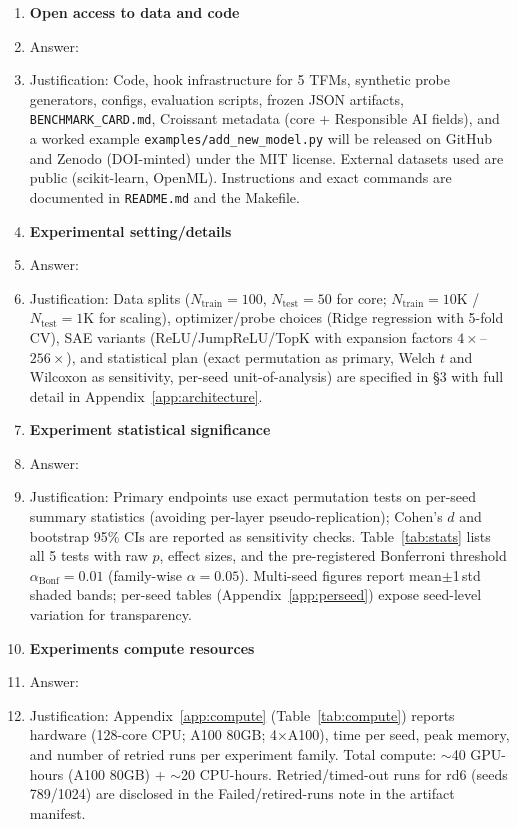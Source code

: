 \documentclass{article}
\begin{document}
\begin{enumerate}
\item {\bf Open access to data and code}
    \item[] Answer: \answerYes{}
    \item[] Justification: Code, hook infrastructure for 5 TFMs, synthetic probe generators, configs, evaluation scripts, frozen JSON artifacts, \texttt{BENCHMARK\_CARD.md}, Croissant metadata (core + Responsible AI fields), and a worked example \texttt{examples/add\_new\_model.py} will be released on GitHub and Zenodo (DOI-minted) under the MIT license. External datasets used are public (scikit-learn, OpenML). Instructions and exact commands are documented in \texttt{README.md} and the Makefile.

\item {\bf Experimental setting/details}
    \item[] Answer: \answerYes{}
    \item[] Justification: Data splits ($N_\text{train}{=}100$, $N_\text{test}{=}50$ for core; $N_\text{train}{=}10$K / $N_\text{test}{=}1$K for scaling), optimizer/probe choices (Ridge regression with 5-fold CV), SAE variants (ReLU/JumpReLU/TopK with expansion factors $4{\times}$--$256{\times}$), and statistical plan (exact permutation as primary, Welch $t$ and Wilcoxon as sensitivity, per-seed unit-of-analysis) are specified in \S3 with full detail in Appendix~\ref{app:architecture}.

\item {\bf Experiment statistical significance}
    \item[] Answer: \answerYes{}
    \item[] Justification: Primary endpoints use exact permutation tests on per-seed summary statistics (avoiding per-layer pseudo-replication); Cohen's $d$ and bootstrap 95\% CIs are reported as sensitivity checks. Table~\ref{tab:stats} lists all 5 tests with raw $p$, effect sizes, and the pre-registered Bonferroni threshold $\alpha_{\text{Bonf}}=0.01$ (family-wise $\alpha=0.05$). Multi-seed figures report mean$\pm$1\,std shaded bands; per-seed tables (Appendix~\ref{app:perseed}) expose seed-level variation for transparency.

\item {\bf Experiments compute resources}
    \item[] Answer: \answerYes{}
    \item[] Justification: Appendix~\ref{app:compute} (Table~\ref{tab:compute}) reports hardware (128-core CPU; A100 80GB; 4$\times$A100), time per seed, peak memory, and number of retried runs per experiment family. Total compute: $\sim$40 GPU-hours (A100 80GB) + $\sim$20 CPU-hours. Retried/timed-out runs for rd6 (seeds 789/1024) are disclosed in the Failed/retired-runs note in the artifact manifest.


\end{enumerate}
\end{document}
